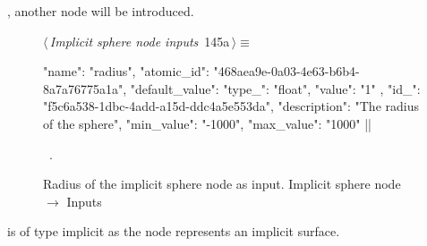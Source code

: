 \documentclass[%
    a4paper,    %
    justified,  %
    nobib,      %
    openany     %
]{tufte-book}
\makeatletter
\renewcommand{\label}[1]{\@tufte@label{##1}}%
\makeatother
\begin{document}
, another node will be
introduced.

\begin{figure}[!htbp]
\begin{flushleft} \small
\begin{minipage}{\linewidth}\label{scrap99}\raggedright\small
{} $\langle\,${\itshape Implicit sphere node inputs}\nobreak\ {\footnotesize {145a}}$\,\rangle\equiv$
\vspace{-1ex}
\begin{pythoncode}
{
    "name": "radius",
    "atomic_id": "468aea9e-0a03-4e63-b6b4-8a7a76775a1a",
    "default_value": {
        "type_": "float",
        "value": "1"
    },
    "id_": "f5c6a538-1dbc-4add-a15d-ddc4a5e553da",
    "description": "The radius of the sphere",
    "min_value": "-1000",
    "max_value": "1000"
}|\NWsep|
\end{pythoncode}
\vspace{1.5ex}
\footnotesize
\begin{list}{}{\setlength{\itemsep}{-\parsep}\setlength{\itemindent}{-\leftmargin}}
\item \NWtxtMacroRefIn\ .

\item{}
\end{list}
\end{minipage}\vspace{4ex}
\end{flushleft}
\caption{Radius of the implicit sphere node as input.
  \newline{}\newline{}Implicit sphere node $\rightarrow$ Inputs}
\end{figure}

 is of type implicit as the node
represents an implicit surface.
\end{document}

